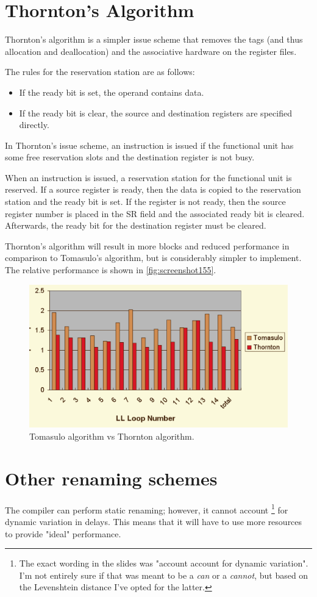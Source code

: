 \section{Thornton's Algorithm}
Thornton's algorithm is a simpler issue scheme that removes the tags (and thus allocation and deallocation) and the associative hardware on the register files.

The rules for the reservation station are as follows: \begin{itemize}
\item If the ready bit is set, the operand contains data.
\item If the ready bit is clear, the source and destination registers are specified directly.
\end{itemize}

In Thornton's issue scheme, an instruction is issued if the functional unit has some free reservation slots and the destination register is not busy.

When an instruction is issued, a reservation station for the functional unit is reserved. If a source register is ready, then the data is copied to the reservation station and the ready bit is set. If the register is not ready, then the source register number is placed in the SR field and the associated ready bit is cleared. Afterwards, the ready bit for the destination register must be cleared.

Thornton's algorithm will result in more blocks and reduced performance in comparison to Tomasulo's algorithm, but is considerably simpler to implement. The relative performance is shown in \autoref{fig:screenshot155}.

\begin{figure}
\centering
\includegraphics[width=0.7\linewidth]{figures/screenshot155}
\caption{Tomasulo algorithm vs Thornton algorithm.}
\label{fig:screenshot155}
\end{figure}

\section{Other renaming schemes}
The compiler can perform static renaming; however, it cannot account \footnote{The exact wording in the slides was "account account for dynamic variation". I'm not entirely sure if that was meant to be a \textit{can} or a \textit{cannot}, but based on the Levenshtein distance I've opted for the latter.} for dynamic variation in delays. This means that it will have to use more resources to provide "ideal" performance.

